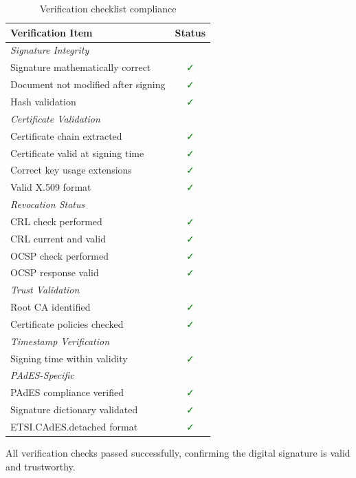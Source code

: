 \documentclass[12pt,a4paper]{article}
\begin{document}
\begin{table}[H]
\centering
\small
\begin{tabular}{lc}
\toprule
\textbf{Verification Item} & \textbf{Status} \\
\midrule
\multicolumn{2}{l}{\textit{Signature Integrity}} \\
Signature mathematically correct & \textcolor{green}{✓} \\
Document not modified after signing & \textcolor{green}{✓} \\
Hash validation & \textcolor{green}{✓} \\
\midrule
\multicolumn{2}{l}{\textit{Certificate Validation}} \\
Certificate chain extracted & \textcolor{green}{✓} \\
Certificate valid at signing time & \textcolor{green}{✓} \\
Correct key usage extensions & \textcolor{green}{✓} \\
Valid X.509 format & \textcolor{green}{✓} \\
\midrule
\multicolumn{2}{l}{\textit{Revocation Status}} \\
CRL check performed & \textcolor{green}{✓} \\
CRL current and valid & \textcolor{green}{✓} \\
OCSP check performed & \textcolor{green}{✓} \\
OCSP response valid & \textcolor{green}{✓} \\
\midrule
\multicolumn{2}{l}{\textit{Trust Validation}} \\
Root CA identified & \textcolor{green}{✓} \\
Certificate policies checked & \textcolor{green}{✓} \\
\midrule
\multicolumn{2}{l}{\textit{Timestamp Verification}} \\
Signing time within validity & \textcolor{green}{✓} \\
\midrule
\multicolumn{2}{l}{\textit{PAdES-Specific}} \\
PAdES compliance verified & \textcolor{green}{✓} \\
Signature dictionary validated & \textcolor{green}{✓} \\
ETSI.CAdES.detached format & \textcolor{green}{✓} \\
\bottomrule
\end{tabular}
\caption{Verification checklist compliance}
\end{table}

All verification checks passed successfully, confirming the digital signature is valid and trustworthy.
\end{document}
